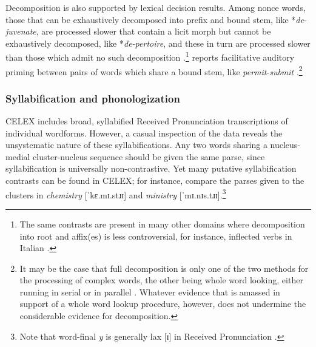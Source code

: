 Decomposition is also supported by lexical decision results. Among nonce words, those that can be exhaustively decomposed into prefix and bound stem, like *\emph{de}-\emph{juvenate}, are processed slower that contain a licit morph but cannot be exhaustively decomposed, like *\emph{de-pertoire}, and these in turn are processed slower than those which admit no such decomposition \citep{Taft1975}.\footnote{The same contrasts are present in many other domains where decomposition into root and affix(es) is less controversial, for instance, inflected verbs in Italian \citep{Caramazza1988}.} \citet{Emmorey1989} reports facilitative auditory priming between pairs of words which share a bound stem, like \emph{permit}-\emph{submit} \citep[though see][]{Marslen-Wilson1994}.\footnote{It may be the case that full decomposition is only one of the two methods for the processing of complex words, the other being whole word looking, either running in serial \citep{Caramazza1988} or in parallel \citep{Baayen1997b}. Whatever evidence that is amassed in support of a whole word lookup procedure, however, does not undermine the considerable evidence for decomposition.}

\subsubsection{Syllabification and phonologization}

CELEX includes broad, syllabified Received Pronunciation transcriptions of individual wordforms. However, a casual inspection of the data reveals the unsystematic nature of these syllabifications. Any two words sharing a nucleus-medial cluster-nucleus sequence should be given the same parse, since syllabification is universally non-contrastive. Yet many putative syllabification contrasts can be found in CELEX; for instance, compare the parses given to the clusters in \emph{chemistry} [ˈkɛ.mɪ.stɹɪ] and \emph{ministry} [ˈmɪ.nɪs.tɹɪ].\footnote{Note that word-final \emph{y} is generally lax [ɪ] in Received Pronunciation \citep[][II.294]{AOE}.}

